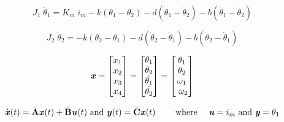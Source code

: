 \begin{equation}
J_1 \; \ddot{\theta}_1 = K_m \; i_m - k(\theta_1-\theta_2) - d(\dot{\theta}_1-\dot{\theta}_2) - b(\dot{\theta}_1-\dot{\theta}_2)
\label{eq:1}
\end{equation}

\begin{equation}
J_2 \; \ddot{\theta}_2 = -k(\theta_2-\theta_1) - d(\dot{\theta}_2-\dot{\theta}_1) - b(\dot{\theta}_2-\dot{\theta}_1)
\label{eq:2}
\end{equation}

\begin{equation}
\label{eq:3}
\text{\textit{\textbf{x}}}=
\begin{bmatrix}
x_1\\
x_2 \\
x_3 \\
x_4 
\end{bmatrix}
=
\begin{bmatrix}
\theta_1\\
 \theta_2\\
\dot{\theta_1}\\
\dot{\theta_2}
\end{bmatrix}
=
\begin{bmatrix}
\theta_1\\
\theta_2\\
\omega_1\\
\ \omega_2
\end{bmatrix}
\end{equation}

\begin{equation}
\dot{\text{\textit{\textbf{x}}}}(t) = \bar{\text{\textbf{A}}}\text{\textit{\textbf{x}}}(t) +  \bar{\text{\textbf{B}}}\text{\textit{\textbf{u}}}(t) \text{ and } \text{\textit{\textbf{y}}}(t) = \bar{\text{\textbf{C}}}\text{\textit{\textbf{x}}}(t) \qquad \text{ where } \quad \text{\textit{\textbf{u}}}=i_m \text{ and \textit{\textbf{y}}}=\theta_1
\end{equation}

